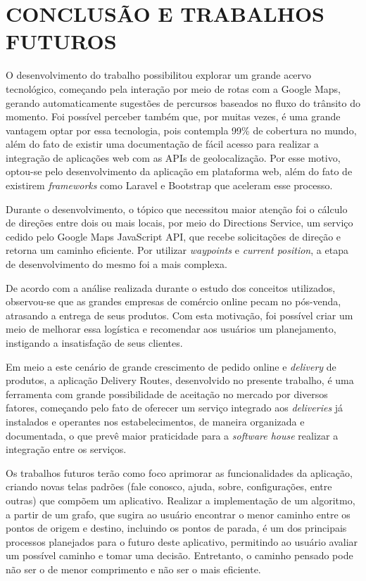 \chapter{CONCLUSÃO E TRABALHOS FUTUROS}
O desenvolvimento do trabalho possibilitou explorar um grande acervo tecnológico, começando pela interação por meio de rotas com a Google Maps, gerando automaticamente sugestões de percursos baseados no fluxo do trânsito do momento. Foi possível perceber também que, por muitas vezes, é uma grande vantagem optar por essa tecnologia, pois contempla 99\% de cobertura no mundo, além do fato de existir uma documentação de fácil acesso para realizar a integração de aplicações web com as APIs de geolocalização. Por esse motivo, optou-se pelo desenvolvimento da aplicação em plataforma web, além do fato de existirem \textit{frameworks} como Laravel e Bootstrap que aceleram esse processo.

Durante o desenvolvimento, o tópico que necessitou maior atenção foi o cálculo de direções entre dois ou mais locais, por meio do Directions Service, um serviço cedido pelo Google Maps JavaScript API, que recebe solicitações de direção e retorna um caminho eficiente. Por utilizar \textit{waypoints} e \textit{current position}, a etapa de desenvolvimento do mesmo foi a mais complexa.

De acordo com a análise realizada durante o estudo dos conceitos utilizados, observou-se que as grandes empresas de comércio online pecam no pós-venda, atrasando a entrega de seus produtos. Com esta motivação, foi possível criar um meio de melhorar essa logística e recomendar aos usuários um planejamento, instigando a insatisfação de seus clientes.

Em meio a este cenário de grande crescimento de pedido online e \textit{delivery} de produtos, a aplicação Delivery Routes, desenvolvido no presente trabalho, é uma ferramenta com grande possibilidade de aceitação no mercado por diversos fatores, começando pelo fato de oferecer um serviço integrado aos \textit{deliveries} já instalados e operantes nos estabelecimentos, de maneira organizada e documentada, o que prevê maior praticidade para a \textit{software house} realizar a integração entre os serviços.


Os trabalhos futuros terão como foco aprimorar as funcionalidades da aplicação, criando novas telas padrões (fale conosco, ajuda, sobre, configurações, entre outras) que compõem um aplicativo. 
Realizar a implementação de um algoritmo, a partir de um grafo, que sugira ao usuário encontrar o menor caminho entre os pontos de origem e destino, incluindo os pontos de parada, é um dos principais processos planejados para o futuro deste aplicativo, permitindo ao usuário avaliar um possível caminho e tomar uma decisão. Entretanto, o caminho pensado pode não ser o de menor comprimento e não ser o mais eficiente.


